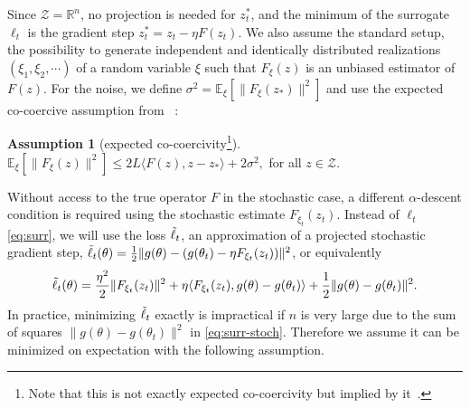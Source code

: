\documentclass{article} %
\theoremstyle{definition}
\newtheorem{assumption}[theorem]{Assumption}
\newcommand{\reals}{\mathbb{R}}
\newcommand{\inner}[2]{\langle #1, #2 \rangle}
\newcommand{\expect}[2][]{\mathbb{E}_{#1}\left[ #2\right]}
\begin{document}
Since $\mathcal{Z}=\reals^n$, no projection is needed for $z_t^\ast$, and the minimum of the surrogate $\ell_t$ is the gradient step $z_t^\ast = z_t - \eta F(z_t)$.
We also assume the standard setup, the possibility to generate independent and identically distributed realizations $(\xi_1, \xi_2, \cdots)$ of a random variable $\xi$ such that $F_{\xi}(z)$ is an unbiased estimator of $F(z)$.
For the noise, we define $\sigma^2 = \expect[\xi]{\|F_\xi(z_\ast)\|^2}$ and use the expected co-coercive assumption from ~\citet{loizou2021stochastic}:
 \begin{assumption}[expected co-coercivity\footnote{Note that this is not exactly expected co-coercivity but implied by it~\citep[Lemma 3.4]{loizou2021stochastic}.}]\label{eq:exp-co}   $\expect[\xi]{\|F_\xi(z)\|^2} \leq 2L\inner{F(z)}{z-z_\ast}+2\sigma^2,$ for all $z \in \mathcal{Z}$. 
 \end{assumption}
Without access to the true operator $F$ in the stochastic case, a different $\alpha$-descent condition is required using the stochastic estimate $F_{\xi_t}(z_t)$.
Instead of $\ell_t$ \eqref{eq:surr}, we will use the loss $\Tilde{\ell}_t$, an approximation of a projected stochastic gradient step, $\Tilde{\ell}_t(\theta) = \frac{1}{2}\|g(\theta)-(g(\theta_t)-\eta F_{\xi_t}(z_t))\|^2$, or equivalently
\begin{align}
    \Tilde{\ell}_t(\theta) = \frac{\eta^2}{2}\|F_{\xi_t}(z_t)\|^2 + \eta\inner{F_{\xi_t}(z_t)}{g(\theta)-g(\theta_t)}+\frac{1}{2}\|g(\theta)-g(\theta_t)\|^2.\label{eq:surr-stoch}
\end{align}
In practice, minimizing $\Tilde{\ell}_t$ exactly is impractical if $n$ is very large due to the sum of squares $\|g(\theta)-g(\theta_t)\|^2$ in \eqref{eq:surr-stoch}. Therefore we assume it can be minimized on expectation with the following assumption. 
\end{document}
